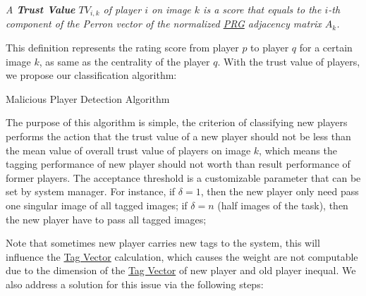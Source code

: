 \begin{definition}
\label{def:tv}
\emph{
A \textbf{Trust Value} $TV_{i,k}$ of player $i$ on image $k$ is a score that
equals to the $i$-th component of the Perron vector of the normalized \hyperref[idx:prg]{PRG} adjacency matrix $A_k$.
}
\end{definition}

This definition represents the rating score from player $p$ to player $q$ for a certain image $k$, as same as the centrality
of the player $q$. With the trust value of players, we propose our classification algorithm:

\begin{algorithm}[H]
\label{algo:malicious}
\SetAlgoLined
{}
\caption{Malicious Player Detection Algorithm}
\end{algorithm}

The purpose of this algorithm is simple, the criterion of classifying new players performs the action that 
the trust value of a new player should not be less than the mean value of overall trust value of players on image $k$, 
which means the tagging performance of new player should not worth than result performance of former players.
The acceptance threshold is a customizable parameter that can be set by system manager.
For instance, if $\delta = 1$, then the new player only need pass one singular image of all tagged images; 
if $\delta = n$ (half images of the task), then the new player have to pass all tagged images;

Note that sometimes new player carries new tags to the system, this will influence the \hyperref[def:tagv]{Tag Vector} calculation,
which causes the weight are not computable due to 
the dimension of the \hyperref[def:tagv]{Tag Vector} of new player and old player inequal.
We also address a solution for this issue via the following steps:

